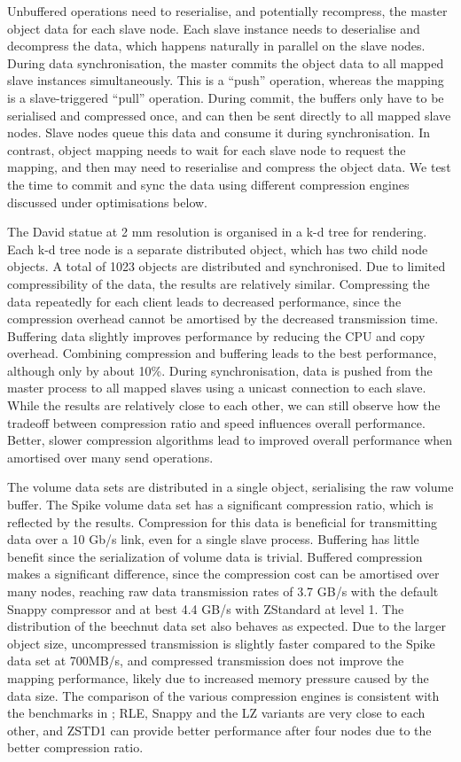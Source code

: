 Unbuffered operations need to reserialise, and potentially recompress, the
master object data for each slave node. Each slave instance needs to
deserialise and decompress the data, which happens naturally in parallel on the
slave nodes. During data synchronisation, the master commits the object data to
all mapped slave instances simultaneously. This is a “push” operation, whereas
the mapping is a slave-triggered “pull” operation. During commit, the buffers
only have to be serialised and compressed once, and can then be sent directly
to all mapped slave nodes. Slave nodes queue this data and consume it during
synchronisation. In contrast, object mapping needs to wait for each slave node
to request the mapping, and then may need to reserialise and compress the
object data. We test the time to commit and sync the data using different
compression engines discussed under optimisations below.

The David statue at 2 mm resolution is organised in a k-d tree for rendering.
Each k-d tree node is a separate distributed object, which has two child node
objects. A total of 1023 objects are distributed and synchronised. Due to
limited compressibility of the data, the results are relatively similar.
Compressing the data repeatedly for each client leads to decreased performance,
since the compression overhead cannot be amortised by the decreased
transmission time. Buffering data slightly improves performance by reducing the
CPU and copy overhead. Combining compression and buffering leads to the best
performance, although only by about 10\%. During synchronisation, data is
pushed from the master process to all mapped slaves using a unicast connection
to each slave. While the results are relatively close to each other, we can
still observe how the tradeoff between compression ratio and speed influences
overall performance. Better, slower compression algorithms lead to improved
overall performance when amortised over many send operations.

The volume data sets are distributed in a single object, serialising the raw
volume buffer. The Spike volume data set has a significant compression ratio,
which is reflected by the results. Compression for this data is beneficial for
transmitting data over a 10 Gb/s link, even for a single slave process.
Buffering has little benefit since the serialization of volume data is trivial.
Buffered compression makes a significant difference, since the compression cost
can be amortised over many nodes, reaching raw data transmission rates of 3.7
GB/s with the default Snappy compressor and at best 4.4 GB/s with ZStandard at
level 1. The distribution of the beechnut data set also behaves as expected.
Due to the larger object size, uncompressed transmission is slightly faster
compared to the Spike data set at 700MB/s, and compressed transmission does not
improve the mapping performance, likely due to increased memory pressure caused
by the data size. The comparison of the various compression engines is
consistent with the benchmarks in ; RLE, Snappy and the
LZ variants are very close to each other, and ZSTD1 can provide better
performance after four nodes due to the better compression ratio.

